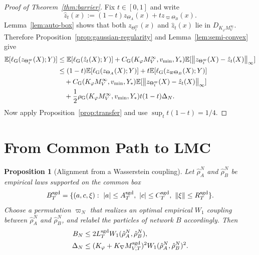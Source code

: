 \documentclass[11pt]{article}
\newtheorem{proposition}[theorem]{Proposition}
\theoremstyle{definition}
\newcommand{\E}{\mathbb{E}}
\newcommand{\norm}[1]{\left\lVert #1 \right\rVert}
\newcommand{\abs}[1]{\left\lvert #1 \right\rvert}
\begin{document}
\begin{proof}[Proof of Theorem~\ref{thm:barrier}]
Fix $t\in[0,1]$ and write
\[
  \hat z_t(x):=(1-t)z_{\Theta_A}(x)+t z_{\varpi\Theta_B}(x).
\]
Lemma~\ref{lem:auto-box} shows that both $z_{\Theta_t^\varpi}(x)$ and
$\hat z_t(x)$
lie in $D_{K_\varphi M_V^\infty}$. Therefore Proposition~\ref{prop:gaussian-regularity}
and Lemma~\ref{lem:semi-convex} give
\begin{align*}
  \E[\ell_{\rm G}(z_{\Theta_t^\varpi}(X);Y)]
  &\le
  \E[\ell_{\rm G}(\hat z_t(X);Y)]
  +
  C_{\rm G}(K_\varphi M_V^\infty,v_{\min},Y_\ast)
  \E[\norm{z_{\Theta_t^\varpi}(X)-\hat z_t(X)}_\infty]
  \\
  &\le
  (1-t)\E[\ell_{\rm G}(z_{\Theta_A}(X);Y)]
  +
  t\E[\ell_{\rm G}(z_{\varpi\Theta_B}(X);Y)]
  \\
  &\quad+
  C_{\rm G}(K_\varphi M_V^\infty,v_{\min},Y_\ast)
  \E[\norm{z_{\Theta_t^\varpi}(X)-\hat z_t(X)}_\infty]
  \\
  &\quad+
  \frac12
  \rho_{\rm G}(K_\varphi M_V^\infty,v_{\min},Y_\ast)
  t(1-t)\Delta_N.
\end{align*}
Now apply Proposition~\ref{prop:transfer} and use $\sup_t t(1-t)=1/4$.
\end{proof}

\section{From Common Path to LMC}

\begin{proposition}[Alignment from a Wasserstein coupling]
\label{prop:alignment}
Let $\hat\rho_A^N$ and $\hat\rho_B^N$ be empirical laws supported on the common
box
\[
  B_T^{\rm sgd}
  =
  \{
    (a,c,\xi):\ \abs{a}\le A_T^{\rm sgd},\ \abs{c}\le C_T^{\rm sgd},\
    \norm{\xi}\le R_T^{\rm sgd}
  \}.
\]
Choose a permutation $\varpi_N$ that realizes an optimal empirical $W_1$
coupling between $\hat\rho_A^N$ and $\hat\rho_B^N$, and relabel the particles
of network $B$ accordingly. Then
\begin{align}
  B_N
  &\le
  2L_T^{\rm sgd}W_1(\hat\rho_A^N,\hat\rho_B^N),
  \label{eq:BN-W1}
  \\
  \Delta_N
  &\le
  (K_\varphi+K_\nabla M_{V,T}^{\rm sgd})^2
  W_1(\hat\rho_A^N,\hat\rho_B^N)^2.
  \label{eq:Delta-W1}
\end{align}
\end{proposition}
\end{document}
